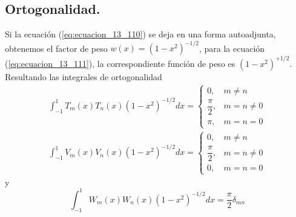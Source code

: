 \subsection{Ortogonalidad.}
Si la ecuación (\ref{eq:ecuacion_13_110}) se deja en una forma autoadjunta, obtenemos el factor de peso $w (x) = (1 - x^{2})^{-1/2}$, para la ecuación (\ref{eq:ecuacion_13_111}), la correspondiente función de peso es $(1 - x^{2})^{+1/2}$. Resultando las integrales de ortogonalidad
\begin{eqnarray}
\int_{-1}^{1} T_{m} (x) T_{n} (x) (1 - x^{2})^{-1/2} dx = 
\begin{cases}
0, & m \neq n \\
\dfrac{\pi}{2}, & m = n \neq 0 \\
\pi, & m = n = 0
\end{cases}
\label{eq:ecuacion_13_120} \\
\int_{-1}^{1} V_{m} (x) V_{n} (x) (1 - x^{2})^{-1/2} dx = 
\begin{cases}
0, & m \neq n \\
\dfrac{\pi}{2}, & m = n \neq 0 \\
0, & m = n = 0
\end{cases}
\label{eq:ecuacion_13_121}
\end{eqnarray}
y
\begin{equation}
\int_{-1}^{1} W_{m} (x) W_{n} (x) (1 - x^{2})^{-1/2} dx = \dfrac{\pi}{2} \delta_{mn}
\label{eq:ecuacion_13_123}
\end{equation}

